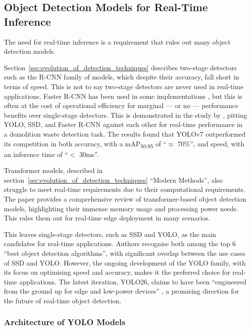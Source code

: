 \subsection{Object Detection Models for Real-Time Inference}

The need for real-time inference is a requirement that rules out many object
detection models.

Section~\ref{sec:evolution_of_detection_techniques} describes two-stage
detectors such as the R-CNN family of models, which despite their accuracy,
fall short in terms of speed. This is not to say two-stage detectors are never
used in real-time applications, Faster R-CNN has been used in some
implementations \citep{dubey2024critical,mao2018towards,ren2017faster}, but
this is often at the cost of operational efficiency for marginal --- or no ---
performance benefits over single-stage detectors. This is demonstrated in the
study by \citet{demetriou2023real}, pitting YOLO, SSD, and Faster R-CNN against
each other for real-time performance in a demolition waste detection task. The
results found that YOLOv7 outperformed its competition in both accuracy, with a
mAP\textsubscript{50:95} of \enquote{$\approx$ 70\%}, and speed, with an
inference time of \enquote{$<$ 30ms}.

Transformer models, described in
section~\ref{sec:evolution_of_detection_techniques} \enquote{Modern Methods},
also struggle to meet real-time requirements due to their computational
requirements. The paper \citet{pagire2025comprehensive} provides a
comprehensive review of transformer-based object detection models, highlighting
their immense memory usage and processing power needs. This rules them out for
real-time edge deployment in many scenarios.

This leaves single-stage detectors, such as SSD and YOLO, as the main
candidates for real-time applications. Authors
\citeauthor{pagire2025comprehensive} recognise both among the top 6
\enquote{best object detection algorithms}, with significant overlap between
the use cases of SSD and YOLO. However, the ongoing development of the YOLO
family, with its focus on optimising speed and accuracy, makes it the preferred
choice for real-time applications. The latest iteration, YOLO26, claims to have
been \enquote{engineered from the ground up for edge and low-power devices}
\citep{jocher2025yolo26}, a promising direction for the future of real-time
object detection.

\subsubsection{Architecture of YOLO Models}

